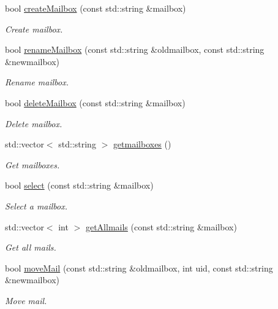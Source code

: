 \begin{DoxyCompactItemize}
bool \hyperlink{classIMAPConnection_a1029095092aa116c6afafdcafa2cb722}{create\+Mailbox} (const std\+::string \&mailbox)
\begin{DoxyCompactList}\small\item\em Create mailbox. \end{DoxyCompactList}\item 
bool \hyperlink{classIMAPConnection_a99c96d59a2ac6bef265c5b283aa2aade}{rename\+Mailbox} (const std\+::string \&oldmailbox, const std\+::string \&newmailbox)
\begin{DoxyCompactList}\small\item\em Rename mailbox. \end{DoxyCompactList}\item 
bool \hyperlink{classIMAPConnection_ad74ab3895b9a999dfd4c4930e6a174e3}{delete\+Mailbox} (const std\+::string \&mailbox)
\begin{DoxyCompactList}\small\item\em Delete mailbox. \end{DoxyCompactList}\item 
std\+::vector$<$ std\+::string $>$ \hyperlink{classIMAPConnection_a24f78f745447f09d6b9a989f5434f151}{getmailboxes} ()
\begin{DoxyCompactList}\small\item\em Get mailboxes. \end{DoxyCompactList}\item 
bool \hyperlink{classIMAPConnection_aa1d8a0670efc9e15e1af37388f7e7726}{select} (const std\+::string \&mailbox)
\begin{DoxyCompactList}\small\item\em Select a mailbox. \end{DoxyCompactList}\item 
std\+::vector$<$ int $>$ \hyperlink{classIMAPConnection_a88d3b9b7821ad6f2a09874015f8a9cfe}{get\+Allmails} (const std\+::string \&mailbox)
\begin{DoxyCompactList}\small\item\em Get all mails. \end{DoxyCompactList}\item 
bool \hyperlink{classIMAPConnection_a852132e646dcc4e658cc26135f452831}{move\+Mail} (const std\+::string \&oldmailbox, int uid, const std\+::string \&newmailbox)
\begin{DoxyCompactList}\small\item\em Move mail. \end{DoxyCompactList}\end{DoxyCompactItemize}


